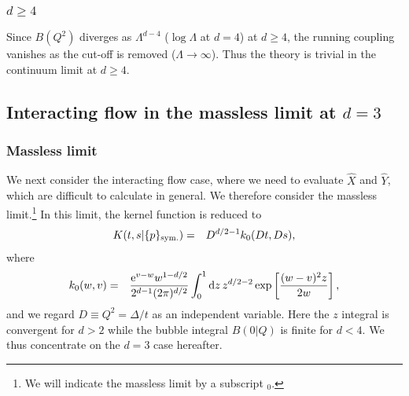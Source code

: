 \documentclass[preprint]{ptephy_v1}%
\newcommand{\rme}{{\rm e}}
\newcommand{\rmd}{{\rm d}}
\begin{document}
\subsubsection{$d\ge 4$}
Since $B(Q^2)$ diverges as $\Lambda^{d-4}$ ($\log \Lambda$ at $d=4$) at $d\ge 4$, the running coupling vanishes as the cut-off is removed ($\Lambda\rightarrow\infty$). 
Thus the theory is trivial in the continuum limit at $d\ge 4$.

\subsection{Interacting flow in the massless limit at $d=3$}
\subsubsection{Massless limit}
We next consider the interacting flow case, where we need to evaluate $\hat X$ and $\hat Y$, which are difficult to calculate in general. We therefore consider the massless limit.\footnote{We will indicate the massless limit by a subscript $_0$.}  In this limit,  the kernel function is reduced to
\begin{eqnarray}
K(t,s\vert \{ p \}_{\rm sym.}) &=& D^{d/2-1} k_0(D t, D s),
\end{eqnarray}
where 
\begin{eqnarray}
k_0(w,v) &=& \frac{\rme^{v-w} w^{1-d/2}}{2^{d-1}(2\pi)^{d/2}}\int_0^1  \rmd z\, z^{d/2-2}\exp\left[\dfrac{(w-v)^2 z}{2w}\right],
\end{eqnarray}
and we regard $D\equiv Q^2=\Delta/t$ as an independent  variable. Here the $z$ integral is convergent for $d>2$ while the bubble integral $B(0\vert Q)$ is finite for $d<4$.
We thus concentrate on the $d=3$ case hereafter.
\end{document}
